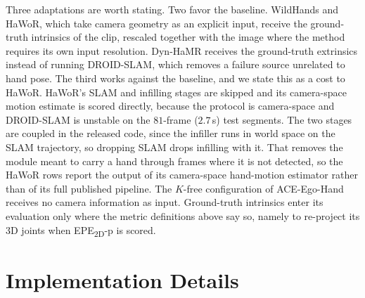 \documentclass[10pt,twocolumn,letterpaper]{article}
\newcommand{\method}{ACE-Ego-Hand} %
\begin{document}
Three adaptations are worth stating. Two favor the baseline. WildHands and HaWoR, which take camera geometry as an explicit input, receive the ground-truth intrinsics of the clip, rescaled together with the image where the method requires its own input resolution. Dyn-HaMR receives the ground-truth extrinsics instead of running DROID-SLAM, which removes a failure source unrelated to hand pose. The third works against the baseline, and we state this as a cost to HaWoR. HaWoR's SLAM and infilling stages are skipped and its camera-space motion estimate is scored directly, because the protocol is camera-space and DROID-SLAM is unstable on the $81$-frame ($2.7$\,s) test segments. The two stages are coupled in the released code, since the infiller runs in world space on the SLAM trajectory, so dropping SLAM drops infilling with it. That removes the module meant to carry a hand through frames where it is not detected, so the HaWoR rows report the output of its camera-space hand-motion estimator rather than of its full published pipeline. The $K$-free configuration of \method{} receives no camera information as input. Ground-truth intrinsics enter its evaluation only where the metric definitions above say so, namely to re-project its 3D joints when EPE\textsubscript{2D}-p is scored.

\section{Implementation Details}
\label{sec:supp_impl}
\end{document}
